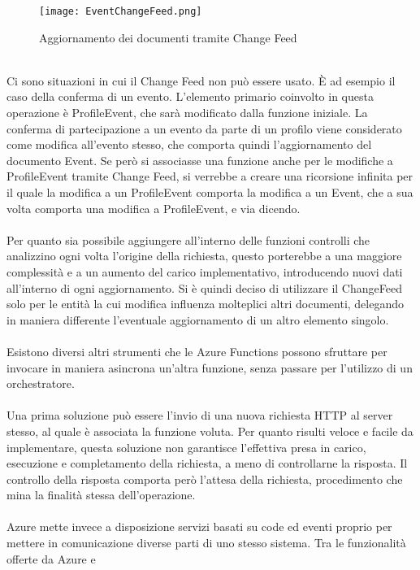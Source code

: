 \begin{figure}[htbp]
    \centering
    \texttt{[image: EventChangeFeed.png]}
    \caption{Aggiornamento dei documenti tramite Change Feed}
\end{figure}
\\
Ci sono situazioni in cui il Change Feed non può essere usato.
È ad esempio il caso della conferma di un evento.
L'elemento primario coinvolto in questa operazione è ProfileEvent,
che sarà modificato dalla funzione iniziale.
La conferma di partecipazione a un evento da parte di un profilo
viene considerato come modifica all'evento stesso,
che comporta quindi l'aggiornamento del documento Event.
Se però si associasse una funzione anche per le modifiche a ProfileEvent tramite Change Feed,
si verrebbe a creare una ricorsione infinita per il quale 
la modifica a un ProfileEvent comporta la modifica a un Event, 
che a sua volta comporta una modifica a ProfileEvent, e via dicendo.\\
\\
Per quanto sia possibile aggiungere all'interno delle funzioni controlli
che analizzino ogni volta l'origine della richiesta,
questo porterebbe a una maggiore complessità e a un aumento del carico implementativo,
introducendo nuovi dati all'interno di ogni aggiornamento.
Si è quindi deciso di utilizzare il ChangeFeed solo per le entità
la cui modifica influenza molteplici altri documenti,
delegando in maniera differente l'eventuale aggiornamento di un altro elemento singolo.\\
\\
Esistono diversi altri strumenti che le Azure Functions possono sfruttare
per invocare in maniera asincrona un'altra funzione, senza passare per l'utilizzo di un orchestratore.\\
\\
Una prima soluzione può essere l'invio di una nuova richiesta HTTP al server stesso,
al quale è associata la funzione voluta.
Per quanto risulti veloce e facile da implementare,
questa soluzione non garantisce l'effettiva
presa in carico, esecuzione e completamento della richiesta,
a meno di controllarne la risposta.
Il controllo della risposta comporta però l'attesa della richiesta,
procedimento che mina la finalità stessa dell'operazione.\\
\\
Azure mette invece a disposizione servizi basati su code ed eventi
proprio per mettere in comunicazione diverse parti di uno stesso sistema.
Tra le funzionalità offerte da Azure e
